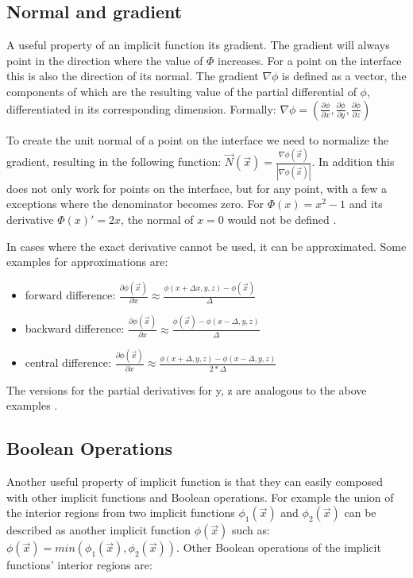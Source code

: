 \subsection{Normal and gradient}

A useful property of an implicit function its gradient. The gradient will always point in the direction where the value of $\Phi$ increases. For a point on the interface this is also the direction of its normal. The gradient $\nabla\phi$ is defined as a vector, the components of which are the resulting value of the partial differential of $\phi$, differentiated in its corresponding dimension\cite{osher:2006:level}. Formally: $\nabla\phi = (\frac{\partial\phi}{\partial x},\frac{\partial\phi}{\partial y},\frac{\partial\phi}{\partial z})$ 

To create the unit normal of a point on the interface we need to normalize the gradient, resulting in the following function: $\vec{N}(\vec{x}) = \frac{\nabla\phi(\vec{x})}{|\nabla\phi(\vec{x})|}$. In addition this does not only work for points on the interface, but for any point, with a few a exceptions where the denominator becomes zero. For $\Phi(x) = x^2 - 1$ and its derivative $\Phi(x)' = 2x$, the normal of $x = 0$ would not be defined \cite{osher:2006:level}.

In cases where the exact derivative cannot be used, it can be approximated. Some examples for approximations are:
\begin{itemize}
	\item forward difference:  $\frac{\partial\phi(\vec{x})}{\partial x} \approx \frac{\phi(x+\Delta x, y, z) - \phi(\vec{x})}{\Delta}$
	\item backward difference: $\frac{\partial\phi(\vec{x})}{\partial x} \approx \frac{\phi(\vec{x}) - \phi(x-\Delta, y, z)}{\Delta}$
	\item central difference: $\frac{\partial\phi(\vec{x})}{\partial x} \approx \frac{\phi(x+\Delta, y, z) - \phi(x-\Delta, y, z)}{2*\Delta}$
\end{itemize}

The versions for the partial derivatives for y, z are analogous to the above examples \cite{osher:2006:level}.


\subsection{Boolean Operations}
\label{section:boolean}
Another useful property of implicit function is that they can easily composed with other implicit functions and Boolean operations. For example the union of the interior regions from two implicit functions $\phi_1(\vec{x})$ and $\phi_2(\vec{x})$ can be described as another implicit function $\phi(\vec{x})$ such as: $\phi(\vec{x}) = min(\phi_1(\vec{x}), \phi_2(\vec{x}))$. Other Boolean operations of the implicit functions' interior regions are:
 
